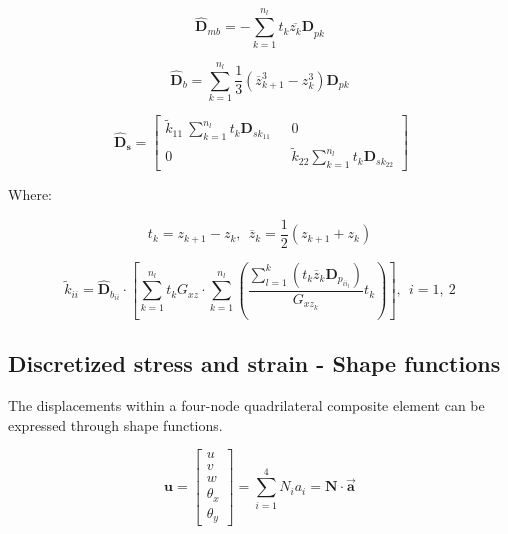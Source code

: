 \begin{equation}
{\hat{\mathbf{D}}}_{mb} = - \sum_{k = 1}^{n_{l}}{t_{k}{\overline{z_{k}}\mathbf{D}}_{pk}}
\end{equation}

\begin{equation}
    \hat{\mathbf{D}}_{b} = \sum_{k = 1}^{n_{l}} \frac{1}{3} \left( \overline{z}_{k + 1}^{3} - z_{k}^{3} \right) \mathbf{D}_{pk}
\end{equation}


\begin{equation}
\ {\hat{\mathbf{D}}}_{\mathbf{s}}=\begin{bmatrix}
{\widetilde{k}}_{11}\ \sum_{k = 1}^{n_{l}}{t_{k}\mathbf{D}_{sk_{11}}}\ \ \  & 0 \\
0 & {\widetilde{k}}_{22}\sum_{k = 1}^{n_{l}}{t_{k}\mathbf{D}_{sk_{22}}}
\end{bmatrix}
\end{equation}

Where:

\[t_{k} = z_{k + 1} - z_{k},\ \ {\overline{z}}_{k} = \frac{1}{2}\left( z_{k + 1} + z_{k} \right)\]

\[{\widetilde{k}}_{ii} = {\hat{\mathbf{D}}}_{b_{ii}} \cdot \left\lbrack \sum_{k = 1}^{n_{l}}{t_{k}G_{xz}} \cdot \sum_{k = 1}^{n_{l}}\left( \frac{\sum_{l = 1}^{k}\left( t_{k}{\overline{z}}_{k}\mathbf{D}_{p_{{ii}_{l}}} \right)}{G_{xz_{k}}}t_{k} \right) \right\rbrack,\ \ i = 1,\ 2\]

\subsection{\texorpdfstring{Discretized stress and strain - Shape functions}{Discretized stress and strain - Shape functions}}\label{discretized-stress-and-strain---shape-functions}


The displacements within a four-node quadrilateral composite element can
be expressed through shape functions.

\begin{equation}
\mathbf{u} = \begin{bmatrix}
u \\
v \\
w \\
\theta_{x} \\
\theta_{y}
\end{bmatrix} = \sum_{i = 1}^{4}{N_{i}a_{i}} = \mathbf{N \cdot}\vec{\mathbf{a}}
\end{equation}

